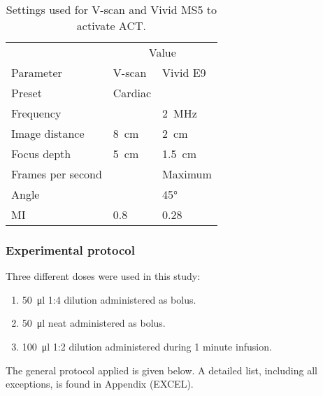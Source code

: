  
\begin{table}[htb]
\label{tab:V-scan vivid}
\caption{Settings used for V-scan and Vivid MS5 to activate ACT\textregistered.}
\begin{center}
\begin{tabular}{@{}l l l @{}}\toprule
& \multicolumn{2}{c}{Value} \\ \cmidrule(r){2-3}
Parameter & V-scan & Vivid E9\\
\midrule
Preset & Cardiac & \\
Frequency & & \SI{2}{\mega\hertz}\\
Image distance & \SI{8}{\centi\meter} & \SI{2}{\centi\meter}\\
Focus depth & \SI{5}{\centi\meter} & \SI{1.5}{\centi\meter}\\
Frames per second & &Maximum\\
Angle & & \ang{45}\\
MI & \num{0.8} & \num{0.28} \\
  \bottomrule
\end{tabular}
\end{center}
\end{table}



\subsubsection{Experimental protocol}
Three different doses were used in this study:

\begin{enumerate}
  \item \SI{50}{\micro\litre} 1:4 dilution administered as bolus.
  \item \SI{50}{\micro\litre} neat administered as bolus.
  \item \SI{100}{\micro\litre} 1:2 dilution administered during 1 minute infusion.
\end{enumerate}
 
The general protocol applied is given below\cite{Healey2014}. A detailed list, including all exceptions, is found in Appendix (EXCEL).

